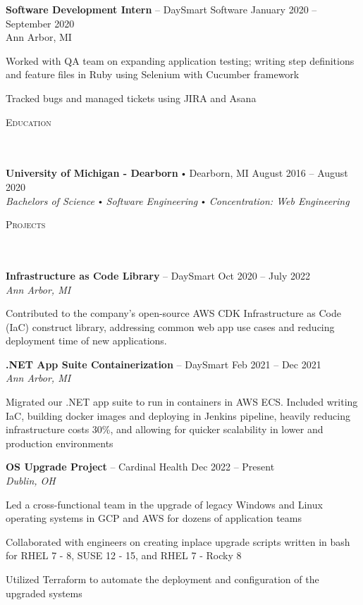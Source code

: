 \documentclass{article}
\newcommand{\header}[1]{{
\hspace*{-15pt}\vspace*{6pt} \textsc{#1}} \vspace*{-6pt} 
\lineunder
}
\newcommand{\lineunder}{
\vspace*{-8pt} \\ \hspace*{-18pt} 
\hrulefill \\
}
\newcommand{\school}[4]{
\textbf{#1} \labelitemi #2 \hfill #3 \\ #4 \vspace*{5pt}
}
\newcommand{\employer}[4]{{
\vspace*{2pt}%
\textbf{#1} #2 \hfill #3\\ #4 \vspace*{2pt}}
}
\newcommand{\project}[4]{{
\vspace*{2pt}%
\textbf{#1} #2 \hfill #3\\ \textit{#4} \vspace*{2pt}}
}
\renewcommand{\labelitemi}{
$\vcenter{\hbox{\tiny$\bullet$}}$\hspace*{3pt}
}
\renewcommand{\labelitemii}{
$\vcenter{\hbox{\tiny$\bullet$}}$\hspace*{-3pt}
}
\newenvironment{bullet-list-minor}{
\begin{list}{\labelitemii}{\setlength\leftmargin{15pt} 
\topsep 0pt \itemsep -2pt}}{\vspace*{4pt}\end{list}
}
\begin{document}
    \employer{Software Development Intern}{-- DaySmart Software}{January 2020 -- September 2020}{Ann Arbor, MI}
	\begin{bullet-list-minor}
	\item Worked with QA team on expanding application testing; writing step definitions and feature files in Ruby using Selenium with Cucumber framework
	\vspace{2pt}
	\item Tracked bugs and managed tickets using JIRA and Asana
    \end{bullet-list-minor}

\vspace{4pt}
\header{Education}
    \school{University of Michigan - Dearborn}{Dearborn, MI}{August 2016 -- August 2020}
    {\textit{Bachelors of Science \labelitemi Software Engineering\labelitemi Concentration: Web Engineering}}

\vspace*{8pt}%
\header{Projects}
    
    \project{Infrastructure as Code Library}{ -- DaySmart}{ Oct 2020 -- July 2022}{ Ann Arbor, MI}
	\begin{bullet-list-minor}
	\item Contributed to the company's open-source AWS CDK Infrastructure as Code (IaC) construct library, addressing common web app use cases and reducing deployment time of new applications.
    \end{bullet-list-minor}
    
    \project{.NET App Suite Containerization}{ -- DaySmart}{ Feb 2021 -- Dec 2021 }{ Ann Arbor, MI}
	\begin{bullet-list-minor}
	\item Migrated our .NET app suite to run in containers in AWS ECS. Included writing IaC, building docker images and deploying in Jenkins pipeline, heavily reducing infrastructure costs 30\%, and allowing for quicker scalability in lower and production environments
    \end{bullet-list-minor}
    
    \project{OS Upgrade Project}{ -- Cardinal Health}{ Dec 2022 -- Present}{ Dublin, OH }
    \begin{bullet-list-minor}
    \item Led a cross-functional team in the upgrade of legacy Windows and Linux operating systems in GCP and AWS for dozens of application teams
    \item Collaborated with engineers on creating inplace upgrade scripts written in bash for RHEL 7 - 8, SUSE 12 - 15, and RHEL 7 - Rocky 8
    \item Utilized Terraform to automate the deployment and configuration of the upgraded systems
    \end{bullet-list-minor}
\end{document}
